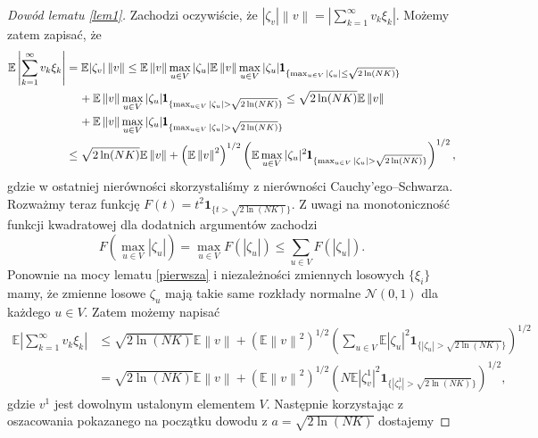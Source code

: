 \documentclass[man,mfiu]{mgrwms}
\newcommand{\norm}[1]{\left\lVert#1\right\rVert}
\begin{document}
\begin{proof} [Dowód lematu \ref{lem1}]
Zachodzi oczywiście, że $|\zeta_v|\norm{v}=\left|\sum_{k=1}^{\infty}v_k\xi_k\right|$. Możemy zatem zapisać, że
\begin{displaymath}
\begin{split}
\mathbb{E}\left|\sum_{k=1}^{\infty}v_k\xi_k\right|&=\mathbb{E}|\zeta_v|\norm{v}\leq \mathbb{E}\norm{v}\max_{u\in V}|\zeta_u|
\mathbb{E}\norm{v}\max_{u\in V}|\zeta_u|\pmb{1}_{\{\max_{u\in V}|\zeta_u|\leq \sqrt{2\ln (NK)}\}}\\
&\hspace{4mm}+\mathbb{E}\norm{v}\max_{u\in V}|\zeta_u|\pmb{1}_{\{\max_{u\in V}|\zeta_u|> \sqrt{2\ln (NK)}\}}
\leq \sqrt{2\ln (NK)}\mathbb{E}\norm{v}\\
&\hspace{4mm}+\mathbb{E}\norm{v}\max_{u\in V}|\zeta_u|\pmb{1}_{\{\max_{u\in V}|\zeta_u|> \sqrt{2\ln (NK)}\}}\\
&\leq \sqrt{2\ln (NK)}\mathbb{E}\norm{v}+\left(\mathbb{E}\norm{v}^2\right)^{1/2}\left(\mathbb{E}\max_{u\in V}|\zeta_u|^2\pmb{1}_{\{\max_{u\in V}|\zeta_u|> \sqrt{2\ln (NK)}\}}\right)^{1/2},
\end{split}
\end{displaymath}
gdzie w ostatniej nierówności skorzystaliśmy z nierówności Cauchy'ego--Schwarza.
Rozważmy teraz funkcję $F(t)=t^2\pmb{1}_{\{t> \sqrt{2\ln (NK)}\}}$. Z uwagi na monotoniczność funkcji kwadratowej dla dodatnich argumentów zachodzi
\begin{displaymath}
F(\max_{u\in V}|\zeta_u|)= \max_{u\in V}F(|\zeta_u|)\leq \sum_{u\in V}F(|\zeta_u|).
\end{displaymath}
Ponownie na mocy lematu \ref{pierwsza} i niezależności zmiennych losowych $\{\xi_i\}$ mamy, że zmienne losowe $\zeta_u$ mają takie same rozkłady normalne $\mathcal{N}(0,1)$ dla każdego $u\in V$. Zatem możemy napisać
\begin{displaymath}
\begin{split}
\mathbb{E}\left|\sum_{k=1}^{\infty}v_k\xi_k\right|&
\leq \sqrt{2\ln (NK)}\mathbb{E}\norm{v}+\left(\mathbb{E}\norm{v}^2\right)^{1/2}\left(\sum_{u\in V}\mathbb{E}|\zeta_u|^2\pmb{1}_{\{|\zeta_u|> \sqrt{2\ln (NK)}\}}\right)^{1/2}\\
&=\sqrt{2\ln (NK)}\mathbb{E}\norm{v}+\left(\mathbb{E}\norm{v}^2\right)^{1/2}\left(N\mathbb{E}|\zeta_v^1|^2\pmb{1}_{\{|\zeta_v^1|> \sqrt{2\ln (NK)}\}}\right)^{1/2},
\end{split}
\end{displaymath}
gdzie $v^1$ jest dowolnym ustalonym elementem $V$.
Następnie korzystając z oszacowania pokazanego na początku dowodu z $a=\sqrt{2\ln (NK)}$ dostajemy

\end{proof}
\end{document}
